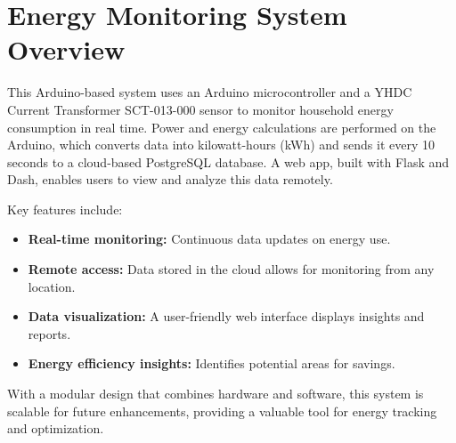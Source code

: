 \section{Energy Monitoring System Overview}

This Arduino-based system uses an Arduino microcontroller and a YHDC Current Transformer SCT-013-000 sensor to monitor household energy consumption in real time. Power and energy calculations are performed on the Arduino, which converts data into kilowatt-hours (kWh) and sends it every 10 seconds to a cloud-based PostgreSQL database. A web app, built with Flask and Dash, enables users to view and analyze this data remotely.

Key features include:
\begin{itemize}
    \item \textbf{Real-time monitoring:} Continuous data updates on energy use.
    \item \textbf{Remote access:} Data stored in the cloud allows for monitoring from any location.
    \item \textbf{Data visualization:} A user-friendly web interface displays insights and reports.
    \item \textbf{Energy efficiency insights:} Identifies potential areas for savings.
\end{itemize}

With a modular design that combines hardware and software, this system is scalable for future enhancements, providing a valuable tool for energy tracking and optimization.
